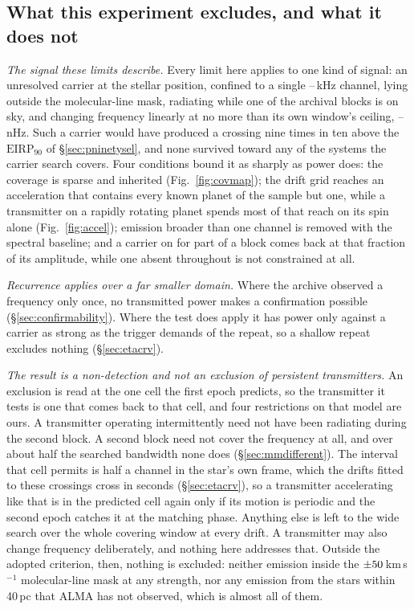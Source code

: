 \subsection{What this experiment excludes, and what it does not}
\label{sec:excludes}

\noindent\emph{The signal these limits describe.} Every limit here applies to
one kind of signal: an unresolved carrier at the stellar position, confined to
a single \ChanLoA--\ChanHiA\,kHz channel, lying outside the molecular-line
mask, radiating while one of the archival blocks is on sky, and changing
frequency linearly at no more than its own window's ceiling,
\DriftCeilLo--\DriftCeilHi\,nHz. Such a carrier would
have produced a crossing nine times in ten above the $\mathrm{EIRP}_{90}$ of
\S\ref{sec:pninetysel}, and none survived toward any of the \NSysClassA{}
systems the carrier search covers. Four conditions
bound it as sharply as power does: the coverage is sparse and
inherited (Fig.~\ref{fig:covmap}); the drift grid reaches an acceleration that contains every
known planet of the sample but one, while a transmitter on a rapidly rotating
planet spends most of that reach on its spin alone (Fig.~\ref{fig:accel}); emission broader than one channel is
removed with the spectral baseline; and a carrier on for part of a block comes
back at that fraction of its amplitude, while one absent throughout is not
constrained at all.

\noindent\emph{Recurrence applies over a far smaller domain.} Where the
archive observed a frequency only once, no transmitted power makes a
confirmation possible (\S\ref{sec:confirmability}). Where the test does apply
it has power only against a carrier as strong as the trigger demands of the
repeat, so a shallow repeat excludes nothing (\S\ref{sec:etacrv}).

\noindent\emph{The result is a non-detection and not an exclusion of
persistent transmitters.} An exclusion is read at the one cell the first
epoch predicts, so the transmitter it tests is one that comes back to that
cell, and four restrictions on that model are
ours. A transmitter operating intermittently need not have been radiating
during the second block. A second block need not cover the frequency at all,
and over about half the searched bandwidth none does
(\S\ref{sec:mmdifferent}). The interval that cell permits is half a channel in the star's own frame,
which the drifts fitted to these crossings cross in seconds
(\S\ref{sec:etacrv}), so a transmitter accelerating like that is in the
predicted cell again only if its motion is periodic and the second epoch
catches it at the matching phase. Anything else is left to the wide search
over the whole covering window at every drift. A transmitter may also change frequency deliberately,
and nothing here addresses that. Outside the adopted criterion, then, nothing
is excluded: neither emission inside the
$\pm50$\,km\,s$^{-1}$ molecular-line mask at any strength, nor any
emission from the \NGaiaCensus{} stars within 40\,pc that ALMA has not
observed, which is almost all of them.

